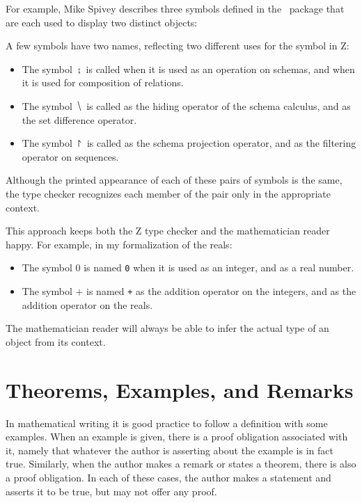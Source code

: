 \documentclass{amsart}
\begin{document}
For example, Mike Spivey \cite{spivey-fm} describes three symbols defined in the \fuzz\ package 
that are each used to display two distinct objects:
\begin{displayquote}
A few symbols have two names, reflecting two different uses for the
symbol in Z:
\begin{itemize}
\item The symbol $\semi$ is called 
 when it is used as an operation on schemas, and 
 when it is used for composition of relations.
\item The symbol $\hide$ is called
 as the hiding operator of the schema calculus, and 
 as the set difference operator. 
\item The symbol $\project$ is called
 as the schema projection operator, and 
 as the filtering operator on sequences.
\end{itemize}
Although the printed appearance of
each of these pairs of symbols is the same, the type checker
recognizes each member of the pair only in the appropriate
\hbox{context}.
\end{displayquote}
This approach keeps both the Z type checker and the mathematician reader happy.
For example, in my formalization of the reals:
\begin{itemize} 
\item The symbol $0$ is named 
\texttt{0} when it is used as an integer, and 
 as a real number.
\item The symbol $+$ is named 
\texttt{+} as the addition operator on the integers, and
 as the addition operator on the reals.
\end{itemize}
The mathematician reader will always be able to infer the actual type of an object from its context.

\section{Theorems, Examples, and Remarks}

In mathematical writing it is good practice to follow a definition with some examples.
When an example is given, there is a proof obligation associated with it,
namely that whatever the author is asserting about the example is in fact true.
Similarly, when the author makes a remark or states a theorem, there is also a proof obligation.
In each of these cases, the author makes a statement and asserts it to be true, but may not offer any proof.
\end{document}
